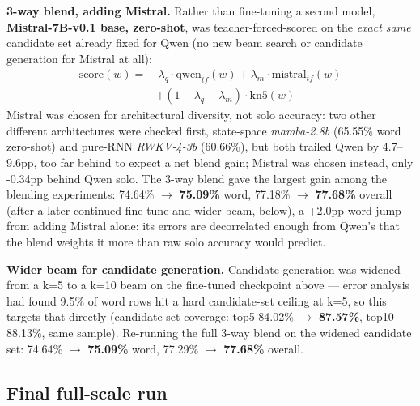 \documentclass[11pt,conference]{IEEEtran}
\newcommand{\code}[1]{\textit{#1}}
\begin{document}
\textbf{3-way blend, adding Mistral.} Rather than fine-tuning a second model,
\textbf{Mistral-7B-v0.1 base, zero-shot}, was teacher-forced-scored on the
\emph{exact same} candidate set already fixed for Qwen (no new beam search or
candidate generation for Mistral at all):
\begin{equation}
\begin{split}
\text{score}(w) = &\ \lambda_q \cdot \text{qwen}_{tf}(w) + \lambda_m \cdot \text{mistral}_{tf}(w) \\
&+ (1-\lambda_q-\lambda_m) \cdot \text{kn5}(w)
\end{split}
\label{eq:blend3}
\end{equation}
Mistral was chosen for architectural diversity, not solo accuracy: two other
different architectures were checked first, state-space \code{mamba-2.8b}
(65.55\% word zero-shot) and pure-RNN \code{RWKV-4-3b} (60.66\%), but both
trailed Qwen by 4.7--9.6pp, too far behind to expect a net blend gain;
Mistral was chosen instead, only -0.34pp behind Qwen solo. The 3-way blend
gave the largest gain among the blending experiments: 74.64\% $\rightarrow$
\textbf{75.09\%} word, 77.18\% $\rightarrow$ \textbf{77.68\%} overall (after
a later continued fine-tune and wider beam, below), a +2.0pp word jump from
adding Mistral alone: its errors are decorrelated enough from Qwen's that
the blend weights it more than raw solo accuracy would predict.

\textbf{Wider beam for candidate generation.} Candidate generation was
widened from a k=5 to a k=10 beam on the fine-tuned checkpoint above ---
error analysis had found 9.5\% of word rows hit a hard candidate-set ceiling
at k=5, so this targets that directly (candidate-set coverage: top5 84.02\%
$\to$ \textbf{87.57\%}, top10 88.13\%, same sample). Re-running the full
3-way blend on the widened candidate set: 74.64\% $\to$ \textbf{75.09\%}
word, 77.29\% $\to$ \textbf{77.68\%} overall.

\subsection{Final full-scale run}
\label{sec:final}
\end{document}
